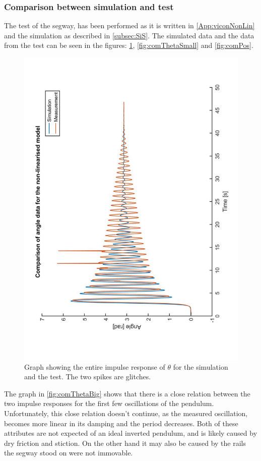 \subsubsection{Comparison between simulation and test}\label{subsec:CSR}
The test of the segway, has been performed as it is written in \autoref{App:viconNonLin} and the simulation as described in \autoref{subsec:SiS}. The simulated data and the data from the test can be seen in the figures: \ref{fig:comThetaBig}, \ref{fig:comThetaSmall} and \ref{fig:comPos}.
\begin{figure}
\includegraphics[height=\textwidth, angle = -90]{figures/SimMesInvPenThetaBig.pdf}
\caption{Graph showing the entire impulse response of $\theta$ for the simulation and the test. The two spikes are glitches. \label{fig:comThetaBig}}
\end{figure}
The graph in \autoref{fig:comThetaBig} shows that there is a close relation between the two impulse responses for the first few oscillations of the pendulum. Unfortunately, this close relation doesn't continue, as the measured oscillation, becomes more linear in its damping and the period decreases. Both of these attributes are not expected of an ideal inverted pendulum, and is likely caused by dry friction and stiction. On the other hand it may also be caused by the rails the segway stood on were not immovable.

